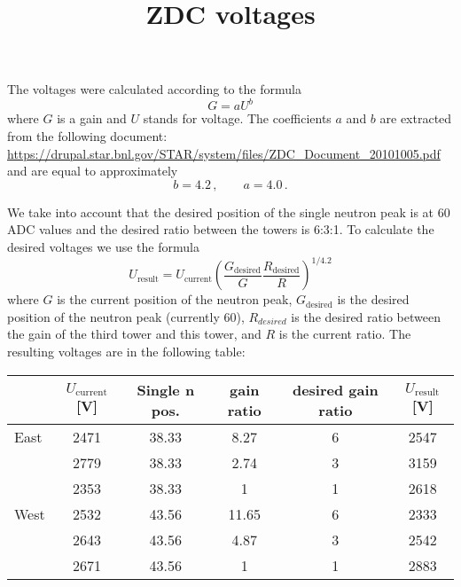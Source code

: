 \documentclass[a4paper,10pt]{article}
\title{ZDC voltages}
\author{}
\date{}
\begin{document}
\maketitle

The voltages were calculated according to the formula
$$
G = aU^b
$$
where $G$ is a gain and $U$ stands for voltage. The coefficients $a$ and $b$ are 
extracted from the following document:\\
\url{https://drupal.star.bnl.gov/STAR/system/files/ZDC_Document_20101005.pdf}\\
and are equal to approximately
$$
b=4.2\,, \qquad a=4.0\,.
$$

We take into account that the desired position of the single neutron peak is at 60 ADC values
and the desired ratio between the towers is 6:3:1. To calculate the desired voltages we use the
formula
$$
U_{\text{result}} = U_\text{current}\left(\frac{G_\text{desired}}{G} 
\frac{R_\text{desired}}{R}\right)^{1/4.2}
$$
where $G$ is the current position of the neutron peak, $G_\text{desired}$ is the desired position
of the neutron peak (currently 60), $R_{desired}$ is the desired ratio between the gain of the third
tower and this tower, and $R$ is the current ratio.
The resulting voltages are in the following table:
\begin{center}
\begin{tabular}{lccccc}
 \toprule
 &$U_\text{current}$[V]&Single n pos.&gain ratio&desired gain ratio&$U_\text{result}$[V]\\
\midrule
 East&2471&38.33&8.27&6&2547\\
&2779&38.33&2.74&3&3159\\
&2353&38.33&1&1&2618\\
 \midrule
West&2532&43.56&11.65&6&2333\\
&2643&43.56&4.87&3&2542\\
&2671&43.56&1&1&2883\\
 \bottomrule
\end{tabular}

\end{center}
\end{document}
